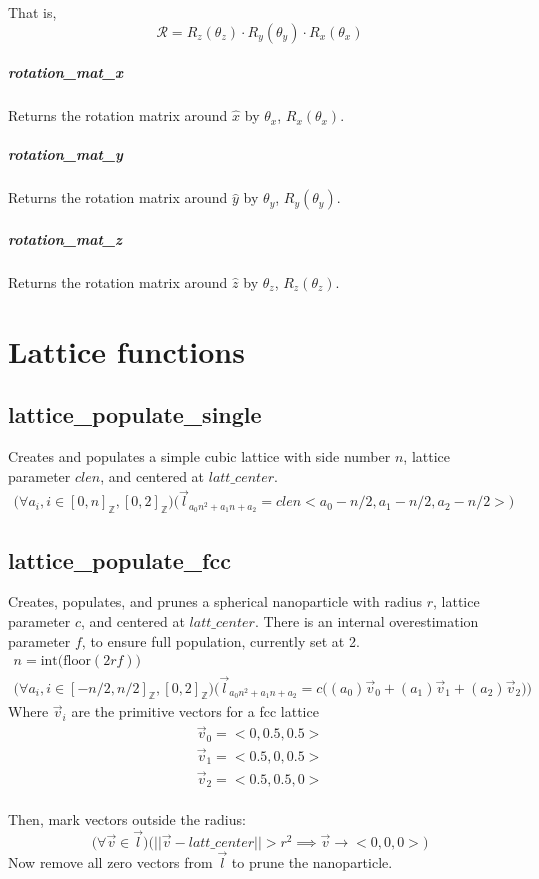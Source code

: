 \documentclass{article}
\begin{document}
			That is,
				\begin{equation}
					\mathcal{R}=R_z(\theta_z)\cdot R_y(\theta_y)\cdot R_x(\theta_x)
				\end{equation}
			
			\subparagraph{rotation\_mat\_x}
				Returns the rotation matrix around $\hat{x}$ by $\theta_x$, $R_x(\theta_x)$.
				
			\subparagraph{rotation\_mat\_y}
				Returns the rotation matrix around $\hat{y}$ by $\theta_y$, $R_y(\theta_y)$.
			
			\subparagraph{rotation\_mat\_z}
				Returns the rotation matrix around $\hat{z}$ by $\theta_z$, $R_z(\theta_z)$.
				
				
				
	\section{Lattice functions}
		\subsection{lattice\_populate\_single}
			Creates and populates a simple cubic lattice with side number $n$, lattice parameter $clen$, and centered at $latt\_center$.
				\begin{gather}
					\Bigg(  \forall	a_i,i \in [0,n]_{\mathbb{Z}},[0,2]_{\mathbb{Z}}\Bigg) \Bigg( \vec{l}_{a_0 n^2 +a_1 n + a_2} = clen \big< a_0-n/2, a_1-n/2,a_2-n/2 \big>  \Bigg)
				\end{gather}
		
		\subsection{lattice\_populate\_fcc}
			Creates, populates, and prunes a spherical nanoparticle with radius $r$,  lattice parameter $c$, and centered at $latt\_center$. There is an internal overestimation parameter $f$, to ensure full population, currently set at 2.
				\begin{gather*}
					n = \text{int}\bigg(\text{floor} (2rf) \bigg)			\\
					\Bigg(  \forall	a_i,i \in [-n/2,n/2]_{\mathbb{Z}},[0,2]_{\mathbb{Z}}\Bigg) \Bigg( \vec{l}_{a_0 n^2 +a_1 n + a_2} = c  \big( (a_0)\vec{v}_0 + (a_1)\vec{v}_1 + (a_2)\vec{v}_2 \big) \Bigg)
				\end{gather*}
			Where $\vec{v}_i$ are the primitive vectors for a fcc lattice
				\begin{gather*}
					\vec{v}_0= \big<0,0.5,0.5\big>		\\
					\vec{v}_1= \big<0.5,0,0.5\big>		\\
					\vec{v}_2= \big<0.5,0.5,0\big>		\\
				\end{gather*}
			
			Then, mark vectors outside the radius:
				\begin{equation}
					\Bigg(  \forall \vec{v} \in \vec{l}  \Bigg)  \Bigg(  || \vec{v}-latt\_center ||>r^2  \implies \vec{v}\to \big<0,0,0\big> \Bigg)  
				\end{equation}
			Now remove all zero vectors from $\vec{l}$ to prune the nanoparticle.
			
				
\end{document}

